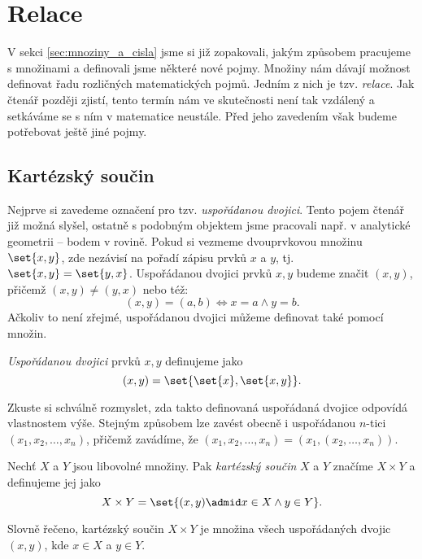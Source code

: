 \section{Relace}\label{sec:relace}
V sekci \ref{sec:mnoziny_a_cisla} jsme si již zopakovali, jakým způsobem pracujeme s množinami a definovali jsme některé nové pojmy. Množiny nám dávají možnost definovat řadu rozličných matematických pojmů. Jedním z nich je tzv. \emph{relace}. Jak čtenář později zjistí, tento termín nám ve skutečnosti není tak vzdálený a setkáváme se s ním v matematice neustále. Před jeho zavedením však budeme potřebovat ještě jiné pojmy.

\subsection{Kartézský součin}
Nejprve si zavedeme označení pro tzv. \emph{uspořádanou dvojici}. Tento pojem čtenář již možná slyšel, ostatně s podobným objektem jsme pracovali např. v analytické geometrii -- bodem v rovině. Pokud si vezmeme dvouprvkovou množinu $\set{x,y}$, zde nezávisí na pořadí zápisu prvků $x$ a $y$, tj. $\set{x,y}=\set{y,x}$. Uspořádanou dvojici prvků $x,y$ budeme značit $(x,y)$, přičemž $(x,y)\neq (y,x)$ nebo též:
\begin{equation*}
    (x,y)=(a,b) \iff x=a \land y=b.
\end{equation*}
Ačkoliv to není zřejmé, uspořádanou dvojici můžeme definovat také pomocí množin.
\begin{definition}
    \emph{Uspořádanou dvojici} prvků $x,y$ definujeme jako
    \begin{equation*}
        (x,y)=\set{\set{x},\set{x,y}}.
    \end{equation*}
\end{definition}
Zkuste si schválně rozmyslet, zda takto definovaná uspořádaná dvojice odpovídá vlastnostem výše. Stejným způsobem lze zavést obecně i uspořádanou $n$-tici $(x_1, x_2, \dots, x_n)$, přičemž zavádíme, že $(x_1, x_2, \dots, x_n)=(x_1, (x_2, \dots, x_n))$.
\begin{definition}
    Nechť $X$ a $Y$ jsou libovolné množiny. Pak \emph{kartézský součin} $X$ a $Y$ značíme $X\times Y$ a definujeme jej jako
    \begin{equation*}
        X\times Y=\set{(x,y) \admid x\in X \land y\in Y}.
    \end{equation*}
\end{definition}
Slovně řečeno, kartézský součin $X\times Y$ je množina všech uspořádaných dvojic $(x,y)$, kde $x\in X$ a $y\in Y$.
